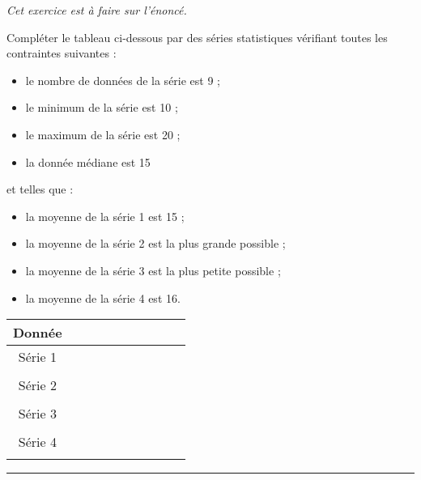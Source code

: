 \begin{exo}[6 points]\label{ds5exo1}
\emph{Cet exercice est \`a faire sur l'\'enonc\'e.}
\vspace{-1em}\begin{multicols}{2}
Compl\'eter le tableau ci-dessous par des s\'eries statistiques v\'erifiant toutes les contraintes suivantes : 
\begin{itemize}
 \item le nombre de donn\'ees de la s\'erie est 9 ;
 \item le minimum de la s\'erie est 10 ;
 \item le maximum de la s\'erie est 20 ;
 \item la donn\'ee m\'ediane est 15
\end{itemize}
et telles que :
\begin{itemize}
 \item la moyenne de la s\'erie 1 est 15 ;
 \item la moyenne de la s\'erie 2 est la plus grande possible ;
 \item la moyenne de la s\'erie 3 est la plus petite possible ;
 \item la moyenne de la s\'erie 4 est 16.
\end{itemize}
\end{multicols}
\begin{tabular}{c*{9}{|p{1.25cm}}}
 Donn\'ee &  &  &  &  &  &  &  &  &  \\ \hline
 S\'erie 1 &&&&&&&&& \\ 
 &&&&&&&&& \\ \hline
 S\'erie 2 &&&&&&&&& \\
 &&&&&&&&& \\ \hline
 S\'erie 3 &&&&&&&&& \\ 
 &&&&&&&&& \\ \hline
 S\'erie 4 &&&&&&&&& \\
 &&&&&&&&& \\
\end{tabular}

\end{exo}

\medskip

\hrule


